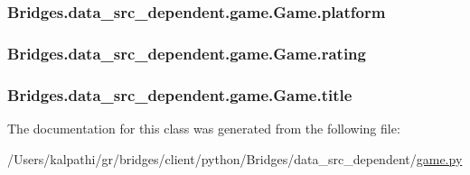 \subsubsection[{platform}]{\setlength{\rightskip}{0pt plus 5cm}Bridges.\+data\+\_\+src\+\_\+dependent.\+game.\+Game.\+platform}\label{class_bridges_1_1data__src__dependent_1_1game_1_1_game_a0730c93ed3ffa8015d75b9ac950ce755}
\hypertarget{class_bridges_1_1data__src__dependent_1_1game_1_1_game_a273b1dc64cf417482d87c88b76eba882}{}
\subsubsection[{rating}]{\setlength{\rightskip}{0pt plus 5cm}Bridges.\+data\+\_\+src\+\_\+dependent.\+game.\+Game.\+rating}\label{class_bridges_1_1data__src__dependent_1_1game_1_1_game_a273b1dc64cf417482d87c88b76eba882}
\hypertarget{class_bridges_1_1data__src__dependent_1_1game_1_1_game_a069ae1bf92787da16e7194c46bb1da48}{}
\subsubsection[{title}]{\setlength{\rightskip}{0pt plus 5cm}Bridges.\+data\+\_\+src\+\_\+dependent.\+game.\+Game.\+title}\label{class_bridges_1_1data__src__dependent_1_1game_1_1_game_a069ae1bf92787da16e7194c46bb1da48}


The documentation for this class was generated from the following file\+:\begin{DoxyCompactItemize}
\item 
/\+Users/kalpathi/gr/bridges/client/python/\+Bridges/data\+\_\+src\+\_\+dependent/\hyperlink{game_8py}{game.\+py}\end{DoxyCompactItemize}
